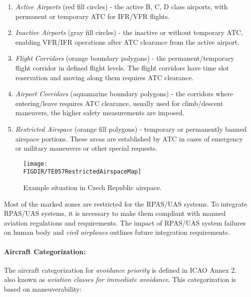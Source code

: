 \begin{enumerate}
    \item \emph{Active Airports} (red fill circles) - the active B, C, D class airports, with permanent or temporary ATC for IFR/VFR flights.
    
    \item \emph{Inactive Airports} (gray fill circles) - the inactive or without temporary ATC, enabling VFR/IFR operations after ATC clearance from the active airport. 
    
    \item \emph{Flight Corridors} (orange boundary polygons) - the permanent/temporary flight corridor in defined flight levels. The flight corridors have time slot reservation and moving along them requires ATC clearance. 
    
    \item \emph{Airport Corridors} (aquamarine boundary polygons) - the corridors where entering/leave requires ATC clearance, usually used for climb/descent maneuvers, the higher safety measurements are imposed.
    
    \item \emph{Restricted Airspace} (orange fill polygons) - temporary or permanently banned airspace portions. These areas are established by ATC in cases of emergency or military maneuvers or other special requests.
\end{enumerate}
\begin{figure}[H]
    \centering
    \texttt{[image: \\FIGDIR/TE057RestrictedAirspaceMap]}
    \caption{Example situation in Czech Republic airspace.}
    \label{fig:exampleSituationCzechAirspace}
\end{figure}

\begin{note}
    Most of the marked zones are restricted for the RPAS/UAS systems. To integrate RPAS/UAS systems, it is necessary to make them compliant with manned aviation regulations and requirements. The impact of RPAS/UAS system failures on human body \cite{authority2013human} and \emph{civil airplanes} \cite{weibel2004safety} outlines future integration requirements.
\end{note}

\paragraph{Aircraft Categorization:} The aircraft categorization for \emph{avoidance priority} is defined in ICAO Annex 2. \cite{icaoAnnex2} also known as \emph{aviation classes for immediate avoidance}. This categorization is based on maneuverability:

